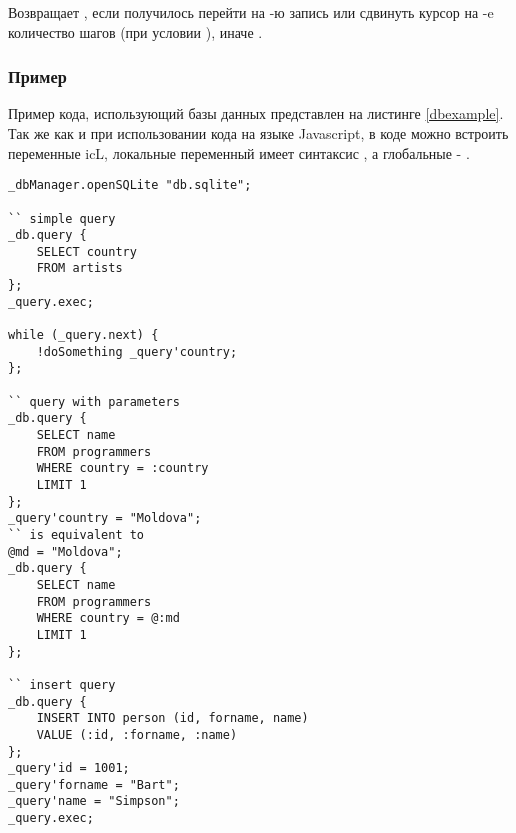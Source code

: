 Возвращает \true, если получилось перейти на -ю запись или сдвинуть курсор на -e количество шагов (при условии ), иначе \false.

\subsubsection{Пример}

Пример кода, использующий базы данных представлен на листинге \ref{dbexample}. Так же как и при использовании кода на языке Javascript, в коде можно встроить переменные icL, локальные переменный имеет синтаксис , а глобальные - .

\begin{lstlisting}[caption=Пример кода использующий базу данных, label=dbexample]
_dbManager.openSQLite "db.sqlite";

`` simple query
_db.query {
	SELECT country
	FROM artists
};
_query.exec;

while (_query.next) {
	!doSomething _query'country;
};

`` query with parameters
_db.query {
	SELECT name
	FROM programmers
	WHERE country = :country
	LIMIT 1
};
_query'country = "Moldova";
`` is equivalent to
@md = "Moldova";
_db.query {
	SELECT name
	FROM programmers
	WHERE country = @:md
	LIMIT 1
};

`` insert query
_db.query {
	INSERT INTO person (id, forname, name)
	VALUE (:id, :forname, :name)
};
_query'id = 1001;
_query'forname = "Bart";
_query'name = "Simpson";
_query.exec;
\end{lstlisting}

